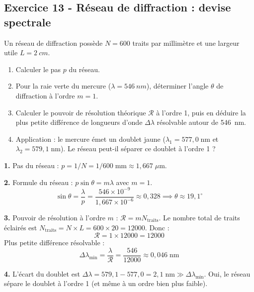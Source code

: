 \documentclass[12pt,a4paper]{article}
\begin{document}
\subsection*{Exercice 13 - Réseau de diffraction : devise spectrale \niveau{\moyen}}

\begin{boiteexercice}
Un réseau de diffraction possède $N = 600$ traits par millimètre et une largeur utile $L = \qty{2}{cm}$.
\begin{enumerate}
  \item Calculer le pas $p$ du réseau.
  \item Pour la raie verte du mercure ($\lambda = \qty{546}{nm}$), déterminer l'angle $\theta$ de diffraction à l'ordre $m=1$.
  \item Calculer le pouvoir de résolution théorique $\mathcal{R}$ à l'ordre 1, puis en déduire la plus petite différence de longueurs d'onde $\Delta\lambda$ résolvable autour de \qty{546}{nm}.
  \item Application : le mercure émet un doublet jaune ($\lambda_1 = 577{,}0\;\text{nm}$ et $\lambda_2 = 579{,}1\;\text{nm}$). Le réseau peut-il séparer ce doublet à l'ordre 1 ?
\end{enumerate}
\end{boiteexercice}

\begin{boitecorrige}
\textbf{1.} Pas du réseau : $p = 1/N = 1/600\;\text{mm} \approx 1{,}667\;\mu\text{m}$.

\textbf{2.} Formule du réseau : $p\sin\theta = m\lambda$ avec $m=1$.
\[
\sin\theta = \frac{\lambda}{p} = \frac{546\times10^{-9}}{1{,}667\times10^{-6}} \approx 0{,}328 \implies \theta \approx 19{,}1^\circ
\]

\textbf{3.} Pouvoir de résolution à l'ordre $m$ : $\mathcal{R} = mN_\text{traits}$. Le nombre total de traits éclairés est $N_\text{traits} = N\times L = 600 \times 20 = 12000$. Donc :
\[
\mathcal{R} = 1 \times 12000 = 12000
\]
Plus petite différence résolvable :
\[
\Delta\lambda_\text{min} = \frac{\lambda}{\mathcal{R}} = \frac{546}{12000} \approx 0{,}046\;\text{nm}
\]

\textbf{4.} L'écart du doublet est $\Delta\lambda = 579{,}1 - 577{,}0 = 2{,}1\;\text{nm} \gg \Delta\lambda_\text{min}$. Oui, le réseau sépare le doublet à l'ordre 1 (et même à un ordre bien plus faible).
\end{boitecorrige}
\end{document}
